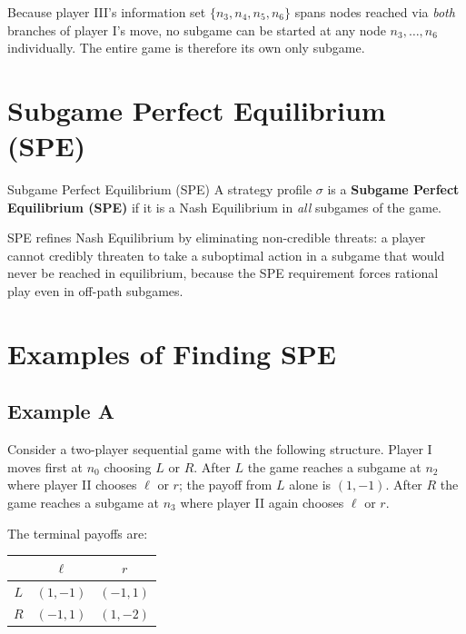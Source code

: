 \documentclass[12pt, a4paper]{article}
\begin{document}
Because player III's information set $\{n_3,n_4,n_5,n_6\}$ spans nodes
reached via \emph{both} branches of player I's move, no subgame can be
started at any node $n_3, \ldots, n_6$ individually. The entire game is
therefore its own only subgame.

\section{Subgame Perfect Equilibrium (SPE)}

\begin{defbox}{Subgame Perfect Equilibrium (SPE)}
  A strategy profile $\sigma$ is a \textbf{Subgame Perfect Equilibrium
  (SPE)} if it is a Nash Equilibrium in \emph{all} subgames of the game.
\end{defbox}

SPE refines Nash Equilibrium by eliminating non-credible threats: a player
cannot credibly threaten to take a suboptimal action in a subgame that would
never be reached in equilibrium, because the SPE requirement forces rational
play even in off-path subgames.

\section{Examples of Finding SPE}

\subsection*{Example A}

Consider a two-player sequential game with the following structure. Player I
moves first at $n_0$ choosing $L$ or $R$. After $L$ the game reaches a
subgame at $n_2$ where player II chooses $\ell$ or $r$; the payoff from $L$
alone is $(1, -1)$. After $R$ the game reaches a subgame at $n_3$ where
player II again chooses $\ell$ or $r$.

\medskip
\noindent The terminal payoffs are:
\begin{center}
  \begin{tabular}{c|cc}
             & $\ell$    & $r$     \\
    \hline
    $L$      & $(1,-1)$  & $(-1,1)$\\
    $R$      & $(-1,1)$  & $(1,-2)$\\
  \end{tabular}
\end{center}
\end{document}

